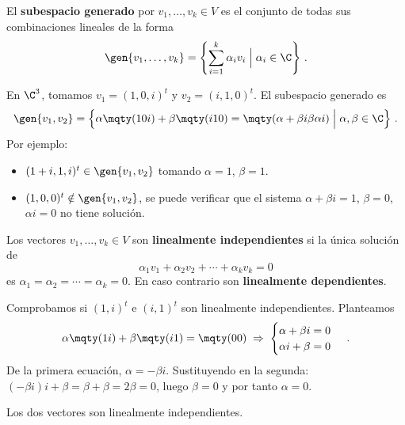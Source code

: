 \begin{defi}
  El \textbf{subespacio generado} por $v_1,\ldots,v_k\in V$ es el conjunto de todas sus combinaciones lineales de la forma
  \[
    \gen{v_1,\ldots,v_k} = \left\{\sum_{i=1}^k \alpha_i v_i \;\Big|\; \alpha_i\in\C\right\}\,.
  \]
\end{defi}

\begin{eje}
  En $\C^3$, tomamos $v_1 = (1,0,i)^t$ y $v_2 = (i,1,0)^t$. El subespacio generado es
  \[
    \gen{v_1,v_2} = \left\{\alpha\mqty(1\\0\\i) + \beta\mqty(i\\1\\0) = \mqty(\alpha+\beta i\\\beta\\\alpha i) \;\Big|\; \alpha,\beta\in\C\right\}\,.
  \]
  Por ejemplo:
  \begin{itemize}
    \item $(1+i, 1, i)^t\in\gen{v_1,v_2}$ tomando $\alpha=1$, $\beta=1$.
    \item $(1,0,0)^t\notin\gen{v_1,v_2}$, se puede verificar que el sistema $\alpha+\beta i = 1$, $\beta = 0$, $\alpha i = 0$ no tiene solución.
  \end{itemize}
\end{eje}

\begin{defi}
  Los vectores $v_1,\ldots,v_k\in V$ son \textbf{linealmente independientes} si la única solución de
  \[
    \alpha_1 v_1 + \alpha_2 v_2 + \cdots + \alpha_k v_k = 0
  \]
  es $\alpha_1=\alpha_2=\cdots=\alpha_k=0$. En caso contrario son \textbf{linealmente dependientes}.
\end{defi}

\begin{eje}
  Comprobamos si $(1,i)^t$ e $(i,1)^t$ son linealmente independientes. Planteamos
  \[
    \alpha\mqty(1\\i) + \beta\mqty(i\\1) = \mqty(0\\0)
    \;\Rightarrow\;
    \begin{cases} \alpha + \beta i = 0 \\ \alpha i + \beta = 0 \end{cases}\,.
  \]
  De la primera ecuación, $\alpha = -\beta i$. Sustituyendo en la segunda: $(-\beta i)i + \beta = \beta + \beta = 2\beta = 0$, luego $\beta=0$ y por tanto $\alpha=0$.

  Los dos vectores son linealmente independientes.
\end{eje}

